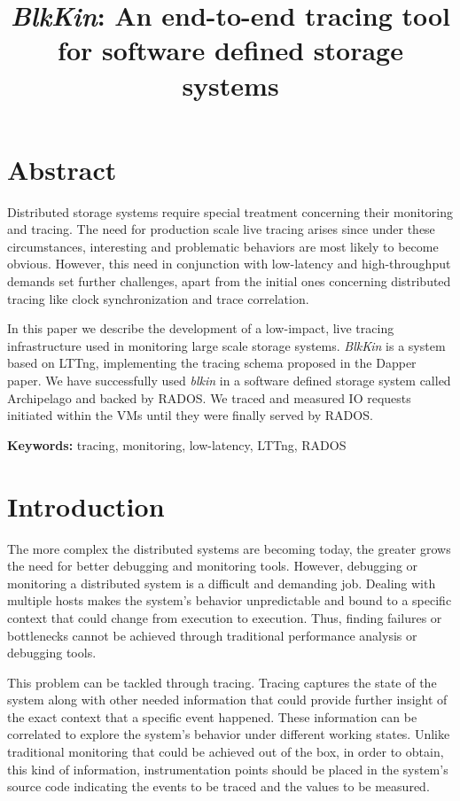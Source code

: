 \documentclass[a4paper,10pt,twocolumn]{article}
\begin{document}
\title{\emph{BlkKin}: An end-to-end tracing tool for software defined storage 
systems}
\date{}
\maketitle

\section*{Abstract}
Distributed storage systems require special treatment concerning their
monitoring and tracing. The need for production scale live tracing arises since
under these circumstances, interesting and problematic behaviors are most likely
to become obvious. However, this need in conjunction with low-latency and
high-throughput demands set further challenges, apart from the initial ones
concerning distributed tracing like clock synchronization and trace correlation.

In this paper we describe the development of a low-impact, live tracing
infrastructure used in monitoring large scale storage systems. \emph{BlkKin} is
a system based on LTTng\cite{lttng}, implementing the tracing schema proposed in
the Dapper paper\cite{dapper}. We have successfully used \emph{blkin} in a
software defined storage system called Archipelago\cite{archip} and  backed by
RADOS\cite{rados}. We traced and measured IO requests initiated within the VMs
until they were finally served by RADOS.


\textbf{Keywords: } tracing, monitoring, low-latency, LTTng, RADOS

\section{Introduction}

The more complex the distributed systems are becoming today, the greater grows
the need for better debugging and monitoring tools. However, debugging or
monitoring a distributed system is a difficult and demanding job. Dealing with
multiple hosts makes the system's behavior unpredictable and bound to a specific
context that could change from execution to execution. Thus, finding failures or
bottlenecks cannot be achieved through traditional performance analysis or
debugging tools. 

This problem can be tackled through tracing. Tracing captures the state of the
system along with other needed information that could provide further insight of
the exact context that a specific event happened. These information can be
correlated to explore the system's behavior under different working states.
Unlike traditional monitoring that could be achieved out of the box, in order to
obtain, this kind of information, instrumentation points should be placed in the
system's source code indicating the events to be traced and the values to be
measured.
\end{document}
